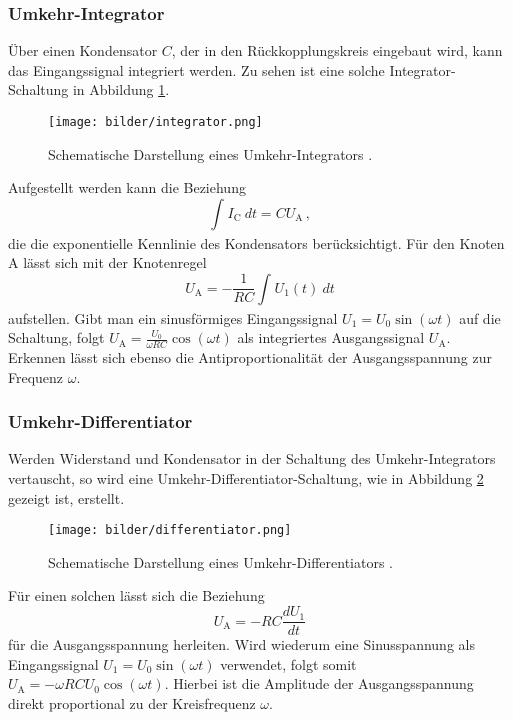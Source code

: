 \subsubsection{Umkehr-Integrator}
Über einen Kondensator $C$, der in den Rückkopplungskreis eingebaut wird, kann das Eingangssignal integriert werden. Zu sehen ist eine solche Integrator-Schaltung in Abbildung \ref{integrator}.

\begin{figure}[H]
  \centering
  \texttt{[image: bilder/integrator.png]}
  \caption{Schematische Darstellung eines Umkehr-Integrators \cite{anleitung}.}
  \label{integrator}
\end{figure}

Aufgestellt werden kann die Beziehung
\begin{equation}
  \int_{}^{} I_\text{C} \ dt=CU_\text{A}\,,
\end{equation}
die die exponentielle Kennlinie des Kondensators berücksichtigt.
Für den Knoten A lässt sich mit der Knotenregel
\begin{equation}
  U_\text{A}=-\frac{1}{RC}\int_{}^{} U_1(t) \ dt
\end{equation}
aufstellen. Gibt man ein sinusförmiges Eingangssignal $U_1=U_0\sin(\omega t)$ auf die Schaltung, folgt $U_\text{A}=\frac{U_0}{\omega RC}\cos(\omega t)$ als integriertes Ausgangssignal $U_\text{A}$. Erkennen lässt sich ebenso die Antiproportionalität der Ausgangsspannung zur Frequenz $\omega$.
\subsubsection{Umkehr-Differentiator}
Werden Widerstand und Kondensator in der Schaltung des Umkehr-Integrators vertauscht, so wird eine Umkehr-Differentiator-Schaltung, wie in Abbildung \ref{differentiator} gezeigt ist, erstellt.

\begin{figure}[H]
  \centering
  \texttt{[image: bilder/differentiator.png]}
  \caption{Schematische Darstellung eines Umkehr-Differentiators \cite{anleitung}.}
  \label{differentiator}
\end{figure}

Für einen solchen lässt sich die Beziehung
\begin{equation}
  U_\text{A}=-RC\frac{dU_1}{dt}
\end{equation}
für die Ausgangsspannung herleiten. Wird wiederum eine Sinusspannung als Eingangssignal $U_1=U_0\sin(\omega t)$ verwendet, folgt somit $U_\text{A}=-\omega RCU_0\cos(\omega t)$. Hierbei ist die Amplitude der Ausgangsspannung direkt proportional zu der Kreisfrequenz $\omega$.
